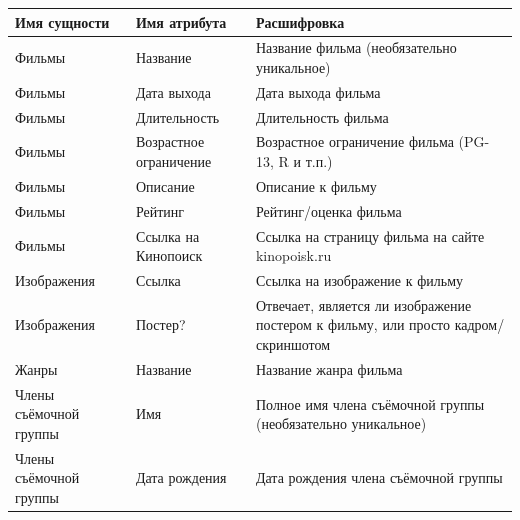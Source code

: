 \documentclass[a4paper,12pt]{article}
\renewcommand{\^}[2]{#1^{\, #2} \kern -1pt}
\newcommand{\1}{\kern 1pt}
\newcommand{\0}{\kern -1pt}
\begin{document}
	\begin{center}
		\begin{tabular}{|p{4cm}|p{4cm}|p{7cm}|}
			\hline
			\textbf{Имя сущности}	& \textbf{Имя атрибута} 	& \textbf{Расшифровка}	\\ \hline
			Фильмы	& Название	& Название фильма (необязательно уникальное)	\\ \hline
			Фильмы	& Дата выхода	& Дата выхода фильма	\\ \hline
			Фильмы	& Длительность	& Длительность фильма	\\ \hline
			Фильмы	& Возрастное ограничение	& Возрастное ограничение фильма (PG-13, R и т.п.)	\\ \hline
			Фильмы	& Описание	& Описание к фильму	\\ \hline
			Фильмы	& Рейтинг	& Рейтинг/оценка фильма	\\ \hline
			Фильмы	& Ссылка на Кинопоиск	& Ссылка на страницу фильма на сайте kinopoisk.ru	\\ \hline
			Изображения	& Ссылка	& Ссылка на изображение к фильму	\\ \hline
			Изображения	& Постер?	& Отвечает, является ли изображение постером к фильму, или просто кадром/скриншотом	\\ \hline
			Жанры	& Название	& Название жанра фильма	\\ \hline
			Члены съёмочной группы	& Имя	& Полное имя члена съёмочной группы (необязательно уникальное)	\\ \hline
			Члены съёмочной группы	& Дата рождения	& Дата рождения члена съёмочной группы	\\ \hline
		\end{tabular}
	\end{center}
\end{document}
